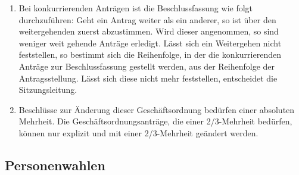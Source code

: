 \documentclass[draft,12pt,oneside]{scrreprt}
\begin{document}
\begin{enumerate}
  \item Bei konkurrierenden Anträgen ist die Beschlussfassung wie folgt durchzuführen:
        Geht ein Antrag weiter als ein anderer, so ist über den weitergehenden
        zuerst abzustimmen.
        Wird dieser angenommen, so sind weniger weit gehende Anträge erledigt.
        Lässt sich ein Weitergehen nicht feststellen, so bestimmt sich die
        Reihenfolge, in der die konkurrierenden Anträge zur Beschlussfassung
        gestellt werden, aus der Reihenfolge der Antragsstellung.
        Lässt sich diese nicht mehr feststellen, entscheidet die Sitzungsleitung.

  \item Beschlüsse zur Änderung dieser Geschäftsordnung bedürfen einer absoluten
        Mehrheit.
        Die Geschäftsordnungsanträge, die einer 2/3-Mehrheit bedürfen, können nur
        explizit und mit einer 2/3-Mehrheit geändert werden.

\end{enumerate}

\subsection{Personenwahlen}
\end{document}
